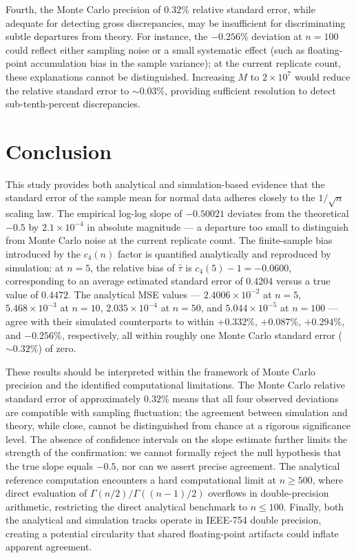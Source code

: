 \documentclass[11pt]{article}
\begin{document}
Fourth, the Monte Carlo precision of $0.32\%$ relative standard error, while adequate for detecting gross discrepancies, may be insufficient for discriminating subtle departures from theory. For instance, the $-0.256\%$ deviation at $n = 100$ could reflect either sampling noise or a small systematic effect (such as floating-point accumulation bias in the sample variance); at the current replicate count, these explanations cannot be distinguished. Increasing $M$ to $2 \times 10^7$ would reduce the relative standard error to $\sim 0.03\%$, providing sufficient resolution to detect sub-tenth-percent discrepancies.

\section{Conclusion}

This study provides both analytical and simulation-based evidence that the standard error of the sample mean for normal data adheres closely to the $1/\sqrt{n}$ scaling law. The empirical log-log slope of $-0.50021$ deviates from the theoretical $-0.5$ by $2.1 \times 10^{-4}$ in absolute magnitude — a departure too small to distinguish from Monte Carlo noise at the current replicate count. The finite-sample bias introduced by the $c_4(n)$ factor is quantified analytically and reproduced by simulation: at $n = 5$, the relative bias of $\hat{\tau}$ is $c_4(5) - 1 = -0.0600$, corresponding to an average estimated standard error of $0.4204$ versus a true value of $0.4472$. The analytical MSE values — $2.4006 \times 10^{-2}$ at $n=5$, $5.468 \times 10^{-3}$ at $n=10$, $2.035 \times 10^{-4}$ at $n=50$, and $5.044 \times 10^{-5}$ at $n=100$ — agree with their simulated counterparts to within $+0.332\%$, $+0.087\%$, $+0.294\%$, and $-0.256\%$, respectively, all within roughly one Monte Carlo standard error ($\sim 0.32\%$) of zero.

These results should be interpreted within the framework of Monte Carlo precision and the identified computational limitations. The Monte Carlo relative standard error of approximately $0.32\%$ means that all four observed deviations are compatible with sampling fluctuation; the agreement between simulation and theory, while close, cannot be distinguished from chance at a rigorous significance level. The absence of confidence intervals on the slope estimate further limits the strength of the confirmation: we cannot formally reject the null hypothesis that the true slope equals $-0.5$, nor can we assert precise agreement. The analytical reference computation encounters a hard computational limit at $n \geq 500$, where direct evaluation of $\Gamma(n/2)/\Gamma((n-1)/2)$ overflows in double-precision arithmetic, restricting the direct analytical benchmark to $n \leq 100$. Finally, both the analytical and simulation tracks operate in IEEE-754 double precision, creating a potential circularity that shared floating-point artifacts could inflate apparent agreement.
\end{document}
